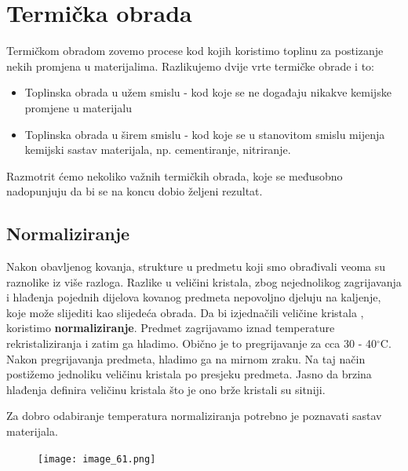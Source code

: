 \documentclass[a4paper,12pt]{article}
\numberwithin{figure}{section}
\begin{document}
\section{Termička obrada}
Termičkom obradom zovemo procese kod kojih koristimo toplinu za postizanje nekih promjena u materijalima. Razlikujemo dvije vrte termičke obrade i to:
\begin{itemize}
\item Toplinska obrada u užem smislu - kod koje se ne događaju nikakve kemijske promjene u materijalu
\item Toplinska obrada u širem smislu - kod koje se u stanovitom smislu mijenja kemijski sastav materijala, np. cementiranje, nitriranje.
\end{itemize}
Razmotrit ćemo nekoliko važnih termičkih obrada, koje se međusobno nadopunjuju da bi se na koncu dobio željeni rezultat.
\subsection{Normaliziranje}
Nakon obavljenog kovanja, strukture u predmetu koji smo obrađivali veoma su raznolike iz više razloga. Razlike u veličini kristala, zbog nejednolikog zagrijavanja i hlađenja pojednih dijelova kovanog predmeta nepovoljno djeluju na kaljenje, koje može slijediti kao slijedeća obrada. Da bi izjednačili veličine kristala , koristimo \textbf{normaliziranje}. Predmet zagrijavamo iznad temperature rekristaliziranja i zatim ga hladimo. Obično je to pregrijavanje za cca 30 - 40$^{\circ}$C. Nakon pregrijavanja predmeta, hladimo ga na mirnom zraku. Na taj način postižemo jednoliku veličinu kristala po presjeku predmeta. Jasno da brzina hlađenja definira veličinu kristala što je ono brže kristali su sitniji. \par
Za dobro odabiranje temperatura normaliziranja potrebno je poznavati sastav materijala.
\begin{figure}[!h]
\centering
\texttt{[image: image\_61.png]}
\end{figure}
\FloatBarrier
\end{document}

